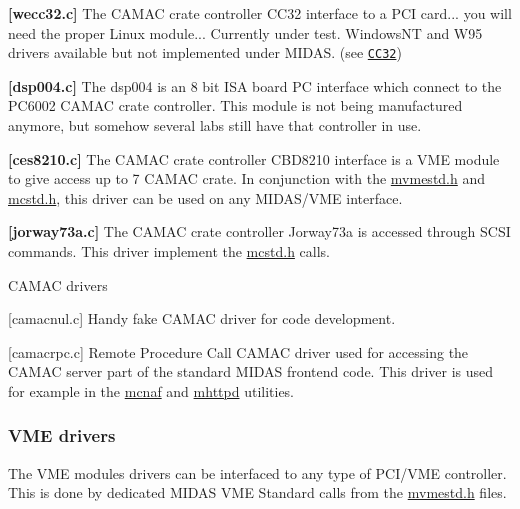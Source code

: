 \begin{DoxyItemize}
\begin{DoxyItemize}
\item {\bfseries \mbox{[}wecc32.c\mbox{]}} The CAMAC crate controller CC32 interface to a PCI card... you will need the proper Linux module... Currently under test. WindowsNT and W95 drivers available but not implemented under MIDAS. (see \href{http://www.wiener-d.com/cc32.htm}{\tt CC32})
\item {\bfseries \mbox{[}dsp004.c\mbox{]}} The dsp004 is an 8 bit ISA board PC interface which connect to the PC6002 CAMAC crate controller. This module is not being manufactured anymore, but somehow several labs still have that controller in use.
\item {\bfseries \mbox{[}ces8210.c\mbox{]}} The CAMAC crate controller CBD8210 interface is a VME module to give access up to 7 CAMAC crate. In conjunction with the \hyperlink{mvmestd_8h}{mvmestd.h} and \hyperlink{mcstd_8h}{mcstd.h}, this driver can be used on any MIDAS/VME interface.
\item {\bfseries \mbox{[}jorway73a.c\mbox{]}} The CAMAC crate controller Jorway73a is accessed through SCSI commands. This driver implement the \hyperlink{mcstd_8h}{mcstd.h} calls.
\end{DoxyItemize}
\end{DoxyItemize}


\begin{DoxyItemize}
\item CAMAC drivers
\begin{DoxyItemize}
\item {\bfseries }\mbox{[}camacnul.c\mbox{]} Handy fake CAMAC driver for code development.
\item {\bfseries }\mbox{[}camacrpc.c\mbox{]} Remote Procedure Call CAMAC driver used for accessing the CAMAC server part of the standard MIDAS frontend code. This driver is used for example in the \hyperlink{FE_utils_FE_mcnaf_utility}{mcnaf} and \hyperlink{RC_mhttpd_utility}{mhttpd} utilities.
\end{DoxyItemize}
\end{DoxyItemize}

\label{FE_Hardware_idx_Hardware_drivers_VME}
\hypertarget{FE_Hardware_idx_Hardware_drivers_VME}{}
 

 \hypertarget{FE_Hardware_VME_drivers}{}\subsubsection{VME drivers}\label{FE_Hardware_VME_drivers}
The VME modules drivers can be interfaced to any type of PCI/VME controller. This is done by dedicated MIDAS VME Standard calls from the \hyperlink{mvmestd_8h}{mvmestd.h} files.


